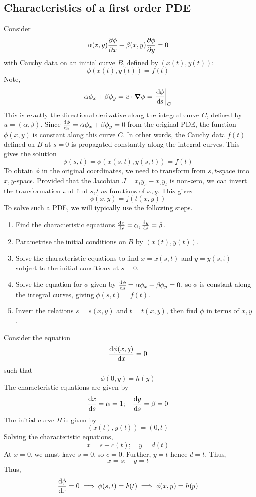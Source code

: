 \subsection{Characteristics of a first order PDE}
Consider
\[
	\alpha(x,y) \pdv{\phi}{x} + \beta(x,y) \pdv{\phi}{y} = 0
\]
with Cauchy data on an initial curve \( B \), defined by \( (x(t), y(t)) \):
\[
	\phi(x(t), y(t)) = f(t)
\]
Note,
\[
	\alpha \phi_x + \beta \phi_y = u \cdot \grad{\phi} = \eval{\dv{\phi}{s}}_C
\]
This is exactly the directional derivative along the integral curve \( C \), defined by \( u = (\alpha, \beta) \).
Since \( \dv{\phi}{s} = \alpha \phi_x + \beta \phi_y = 0 \) from the original PDE, the function \( \phi(x,y) \) is constant along this curve \( C \).
In other words, the Cauchy data \( f(t) \) defined on \( B \) at \( s = 0 \) is propagated constantly along the integral curves.
This gives the solution
\[
	\phi(s,t) = \phi(x(s,t), y(s,t)) = f(t)
\]
To obtain \( \phi \) in the original coordinates, we need to transform from \( s,t \)-space into \( x,y \)-space.
Provided that the Jacobian \( J = x_t y_s - x_s y_t \) is non-zero, we can invert the transformation and find \( s,t \) as functions of \( x,y \).
This gives
\[
	\phi(x,y) = f(t(x,y))
\]
To solve such a PDE, we will typically use the following steps.
\begin{enumerate}
	\item Find the characteristic equations \( \dv{x}{s} = \alpha, \dv{y}{s} = \beta \).
	\item Parametrise the initial conditions on \( B \) by \( (x(t), y(t)) \).
	\item Solve the characteristic equations to find \( x = x(s,t) \) and \( y = y(s,t) \) subject to the initial conditions at \( s = 0 \).
	\item Solve the equation for \( \phi \) given by \( \dv{\phi}{s} = \alpha \phi_x + \beta \phi_y = 0 \), so \( \phi \) is constant along the integral curves, giving \( \phi(s,t) = f(t) \).
	\item Invert the relations \( s = s(x,y) \) and \( t = t(x,y) \), then find \( \phi \) in terms of \( x,y \).
\end{enumerate}
\begin{example}
	Consider the equation
	\[
		\dv{\phi(x,y)}{x} = 0
	\]
	such that
	\[
		\phi(0,y) = h(y)
	\]
	The characteristic equations are given by
	\[
		\dv{x}{s} = \alpha = 1;\quad \dv{y}{s} = \beta = 0
	\]
	The initial curve \( B \) is given by
	\[
		(x(t), y(t)) = (0,t)
	\]
	Solving the characteristic equations,
	\[
		x = s + c(t);\quad y = d(t)
	\]
	At \( x = 0 \), we must have \( s = 0 \), so \( c = 0 \).
	Further, \( y = t \) hence \( d = t \).
	Thus,
	\[
		x = s;\quad y = t
	\]
	Thus,
	\[
		\dv{\phi}{x} = 0 \implies \phi(s,t) = h(t) \implies \phi(x,y) = h(y)
	\]
\end{example}

